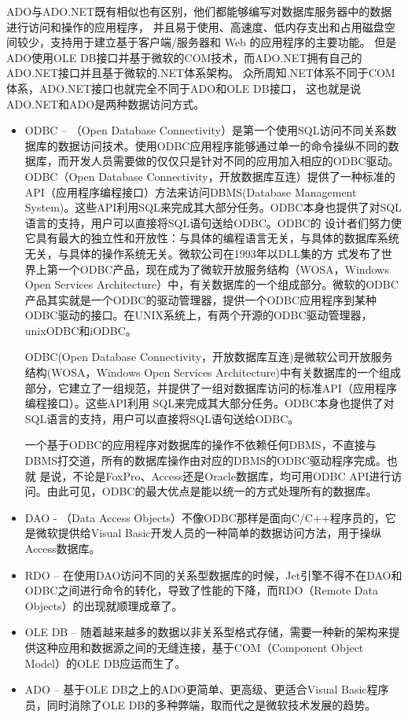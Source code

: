 \documentclass{book}
\begin{document}
ADO与ADO.NET既有相似也有区别，他们都能够编写对数据库服务器中的数据进行访问和操作的应用程序，
并且易于使用、高速度、低内存支出和占用磁盘空间较少，支持用于建立基于客户端/服务器和 Web 的应用程序的主要功能。
但是ADO使用OLE DB接口并基于微软的COM技术，而ADO.NET拥有自己的ADO.NET接口并且基于微软的.NET体系架构。
众所周知.NET体系不同于COM体系，ADO.NET接口也就完全不同于ADO和OLE DB接口，
这也就是说ADO.NET和ADO是两种数据访问方式。

\begin{itemize}
\item{ODBC} – （Open Database Connectivity）是第一个使用SQL访问不同关系数据库的数据访问技术。使用ODBC应用程序能够通过单一的命令操纵不同的数据库，而开发人员需要做的仅仅只是针对不同的应用加入相应的ODBC驱动。 ODBC（Open Database Connectivity，开放数据库互连）提供了一种标准的API（应用程序编程接口）方法来访问DBMS(Database Management System)。这些API利用SQL来完成其大部分任务。ODBC本身也提供了对SQL语言的支持，用户可以直接将SQL语句送给ODBC。ODBC的 设计者们努力使它具有最大的独立性和开放性：与具体的编程语言无关，与具体的数据库系统无关，与具体的操作系统无关。微软公司在1993年以DLL集的方 式发布了世界上第一个ODBC产品，现在成为了微软开放服务结构（WOSA，Windows Open Services Architecture）中，有关数据库的一个组成部分。微软的ODBC产品其实就是一个ODBC的驱动管理器，提供一个ODBC应用程序到某种 ODBC驱动的接口。在UNIX系统上，有两个开源的ODBC驱动管理器，unixODBC和iODBC。

     ODBC(Open Database Connectivity，开放数据库互连)是微软公司开放服务结构(WOSA，Windows Open Services Architecture)中有关数据库的一个组成部分，它建立了一组规范，并提供了一组对数据库访问的标准API（应用程序编程接口）。这些API利用 SQL来完成其大部分任务。ODBC本身也提供了对SQL语言的支持，用户可以直接将SQL语句送给ODBC。

     一个基于ODBC的应用程序对数据库的操作不依赖任何DBMS，不直接与DBMS打交道，所有的数据库操作由对应的DBMS的ODBC驱动程序完成。也就 是说，不论是FoxPro、Access还是Oracle数据库，均可用ODBC API进行访问。由此可见，ODBC的最大优点是能以统一的方式处理所有的数据库。 
\item{DAO} - （Data Access Objects）不像ODBC那样是面向C/C++程序员的，它是微软提供给Visual Basic开发人员的一种简单的数据访问方法，用于操纵Access数据库。
\item{RDO} – 在使用DAO访问不同的关系型数据库的时候，Jet引擎不得不在DAO和ODBC之间进行命令的转化，导致了性能的下降，而RDO（Remote Data Objects）的出现就顺理成章了。
\item{OLE DB} – 随着越来越多的数据以非关系型格式存储，需要一种新的架构来提供这种应用和数据源之间的无缝连接，基于COM（Component Object Model）的OLE DB应运而生了。
\item{ADO} – 基于OLE DB之上的ADO更简单、更高级、更适合Visual Basic程序员，同时消除了OLE DB的多种弊端，取而代之是微软技术发展的趋势。
\end{itemize}
\end{document}
